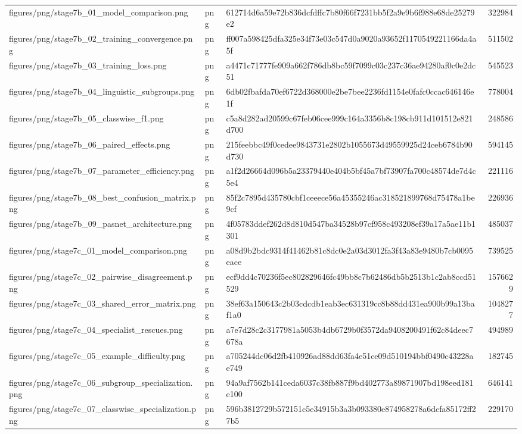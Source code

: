 \begin{tabular}{lllr}
figures/png/stage7b_01_model_comparison.png & png & 612714d6a59e72b836dcfdffc7b80f66f7231bb5f2a9e9b6f988e68de25279e2 & 322984 \\
figures/png/stage7b_02_training_convergence.png & png & ff007a598425dfa325e34f73e03c547d0a9020a93652f1170549221166da4a5f & 511502 \\
figures/png/stage7b_03_training_loss.png & png & a4471c71777fe909a662f786db8bc59f7099c03c237c36ae94280af0c0e2dc51 & 545523 \\
figures/png/stage7b_04_linguistic_subgroups.png & png & 6db02fbafda70ef6722d368000e2be7bee2236fd1154e0fafc0ccac646146e1f & 778004 \\
figures/png/stage7b_05_classwise_f1.png & png & c5a8d282ad20599c67feb06cee999c164a3356b8c198cb911d101512e821d700 & 248586 \\
figures/png/stage7b_06_paired_effects.png & png & 215feebbc49f0cedee9843731e2802b1055673d49559925d24ceb6784b90d730 & 594145 \\
figures/png/stage7b_07_parameter_efficiency.png & png & a1f2d26664d096b5a23379440e404b5bf45a7bf73907fa700c48574de7d4c5e4 & 221116 \\
figures/png/stage7b_08_best_confusion_matrix.png & png & 85f2c7895d435780cbf1ceeece56a45355246ac318521899768d75478a1be9cf & 226936 \\
figures/png/stage7b_09_pasnet_architecture.png & png & 4f05783ddef262d8d810d547ba34528b97cf958c493208ef39a17a5ae11b1301 & 485037 \\
figures/png/stage7c_01_model_comparison.png & png & a08d9b2bdc9314f41462b81c8dc0e2a03d3012fa3f43a83e9480b7cb0095eace & 739525 \\
figures/png/stage7c_02_pairwise_disagreement.png & png & ecf9dd4c70236f5ec802829646fc49bb8c7b62486db5b2513b1c2ab8ccd51529 & 1576629 \\
figures/png/stage7c_03_shared_error_matrix.png & png & 38ef63a150643c2b03cdcdb1eab3ec631319cc8b88dd431ea900b99a13baf1a0 & 1048277 \\
figures/png/stage7c_04_specialist_rescues.png & png & a7e7d28c2c3177981a5053b4db6729b0f3572da9408200491f62c84deec7678a & 494989 \\
figures/png/stage7c_05_example_difficulty.png & png & a705244dc06d2fb410926ad88dd63fa4e51ce09d510194bbf0490c43228ae749 & 182745 \\
figures/png/stage7c_06_subgroup_specialization.png & png & 94a9af7562b141ceda6037c38fb887f9bd402773a89871907bd198eed181e100 & 646141 \\
figures/png/stage7c_07_classwise_specialization.png & png & 596b3812729b572151c5e34915b3a3b093380e874958278a6dcfa85172ff27b5 & 229170 \\

\end{tabular}
